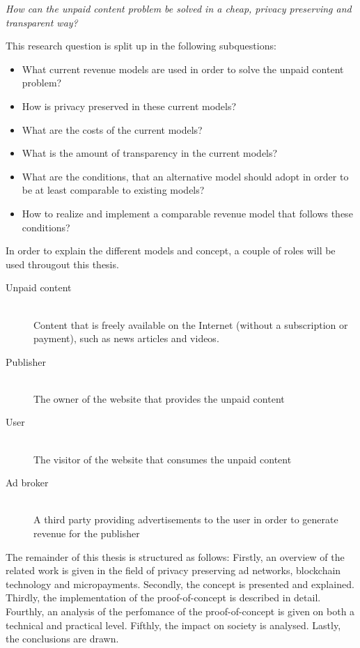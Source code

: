 \textit{How can the unpaid content problem be solved in a cheap, privacy preserving and transparent way?}
\vspace{1em}

\noindent This research question is split up in the following subquestions:

\begin{itemize}
  \item What current revenue models are used in order to solve the unpaid content problem?
  \item How is privacy preserved in these current models?
  \item What are the costs of the current models?
  \item What is the amount of transparency in the current models?
  \item What are the conditions, that an alternative model should adopt in order to be at least comparable to existing models?
  \item How to realize and implement a comparable revenue model that follows these conditions?
\end{itemize}

\label{sec:methodology}
\noindent In order to explain the different models and concept, a couple of roles will be used througout this thesis.

\begin{description}
  \item[Unpaid content] \hfill \\ Content that is freely available on the Internet (without a subscription or payment), such as news articles and videos.
  \item[Publisher] \hfill \\ The owner of the website that provides the unpaid content
  \item[User] \hfill \\ The visitor of the website that consumes the unpaid content
  \item[Ad broker] \hfill \\ A third party providing advertisements to the user in order to generate revenue for the publisher
\end{description} 

\noindent The remainder of this thesis is structured as follows: Firstly, an overview of the related work is given in the field of privacy preserving ad networks, blockchain technology and micropayments. Secondly, the concept is presented and explained. Thirdly, the implementation of the proof-of-concept is described in detail. Fourthly, an analysis of the perfomance of the proof-of-concept is given on both a technical and practical level. Fifthly, the impact on society is analysed. Lastly, the conclusions are drawn.